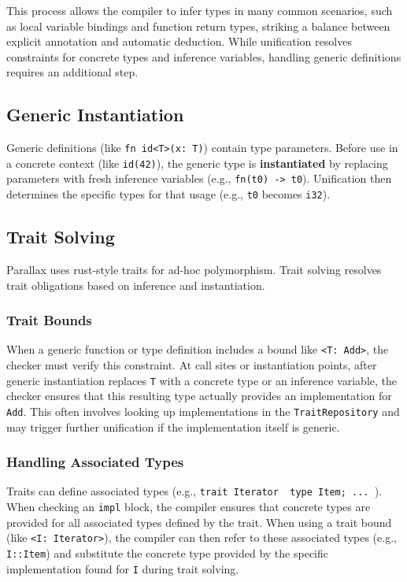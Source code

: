 This process allows the compiler to infer types in many common scenarios, such as local variable bindings and function return types, striking a balance between explicit annotation and automatic deduction. While unification resolves constraints for concrete types and inference variables, handling generic definitions requires an additional step.

\subsection{Generic Instantiation}

Generic definitions (like \texttt{fn id<T>(x: T)}) contain type parameters. Before use in a concrete context (like \texttt{id(42)}), the generic type is \textbf{instantiated} by replacing parameters with fresh inference variables (e.g., \texttt{fn(t0) -> t0}). Unification then determines the specific types for that usage (e.g., \texttt{t0} becomes \texttt{i32}).

\subsection{Trait Solving}

Parallax uses rust-style traits for ad-hoc polymorphism. Trait solving resolves trait obligations based on inference and instantiation.

\subsubsection{Trait Bounds}

When a generic function or type definition includes a bound like \texttt{<T: Add>}, the checker must verify this constraint. At call sites or instantiation points, after generic instantiation replaces \texttt{T} with a concrete type or an inference variable, the checker ensures that this resulting type actually provides an implementation for \texttt{Add}. This often involves looking up implementations in the \texttt{TraitRepository} and may trigger further unification if the implementation itself is generic.

\subsubsection{Handling Associated Types}

Traits can define associated types (e.g., \texttt{trait Iterator { type Item; ... }}). When checking an \texttt{impl} block, the compiler ensures that concrete types are provided for all associated types defined by the trait. When using a trait bound (like \texttt{<I: Iterator>}), the compiler can then refer to these associated types (e.g., \texttt{I::Item}) and substitute the concrete type provided by the specific implementation found for \texttt{I} during trait solving.

